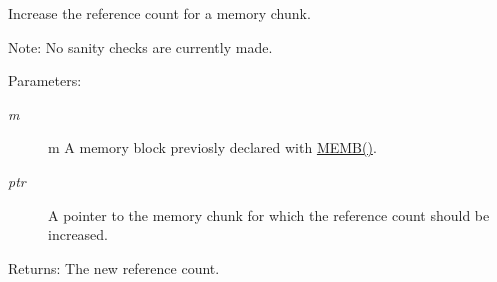 Increase the reference count for a memory chunk. 

\begin{Desc}
\item[Note:]No sanity checks are currently made.\end{Desc}
\begin{Desc}
\item[Parameters:]
\begin{description}
\item[{\em m}]m A memory block previosly declared with \hyperlink{a00060_g8457539d6a6eaecded820f4042b8314a}{MEMB()}.\item[{\em ptr}]A pointer to the memory chunk for which the reference count should be increased.\end{description}
\end{Desc}
\begin{Desc}
\item[Returns:]The new reference count. \end{Desc}

